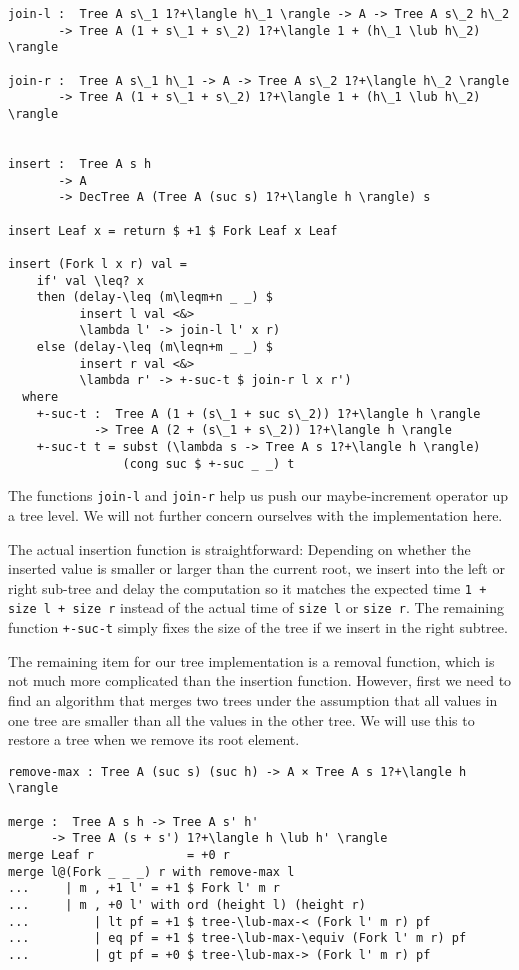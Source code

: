 \begin{lstlisting}[caption={Tree Insertion},label={lst:tree:insert},emph={Tree,Fork,Leaf,insert,join,return,if,then,else}]
join-l :  Tree A s\_1 1?+\langle h\_1 \rangle -> A -> Tree A s\_2 h\_2
       -> Tree A (1 + s\_1 + s\_2) 1?+\langle 1 + (h\_1 \lub h\_2) \rangle

join-r :  Tree A s\_1 h\_1 -> A -> Tree A s\_2 1?+\langle h\_2 \rangle
       -> Tree A (1 + s\_1 + s\_2) 1?+\langle 1 + (h\_1 \lub h\_2) \rangle


insert :  Tree A s h
       -> A
       -> DecTree A (Tree A (suc s) 1?+\langle h \rangle) s

insert Leaf x = return $ +1 $ Fork Leaf x Leaf

insert (Fork l x r) val =
    if' val \leq? x
    then (delay-\leq (m\leqm+n _ _) $
          insert l val <&>
          \lambda l' -> join-l l' x r)
    else (delay-\leq (m\leqn+m _ _) $
          insert r val <&>
          \lambda r' -> +-suc-t $ join-r l x r')
  where
    +-suc-t :  Tree A (1 + (s\_1 + suc s\_2)) 1?+\langle h \rangle
            -> Tree A (2 + (s\_1 + s\_2)) 1?+\langle h \rangle
    +-suc-t t = subst (\lambda s -> Tree A s 1?+\langle h \rangle)
                (cong suc $ +-suc _ _) t
\end{lstlisting}

The functions \texttt{join-l} and \texttt{join-r} help us push our maybe-increment operator up a tree level. We will not further concern ourselves with the implementation here.

The actual insertion function is straightforward: Depending on whether the inserted value is smaller or larger than the current root, we insert into the left or right sub-tree and delay the computation so it matches the expected time \texttt{1 + size l + size r} instead of the actual time of \texttt{size l} or \texttt{size r}. The remaining function \texttt{+-suc-t} simply fixes the size of the tree if we insert in the right subtree.

The remaining item for our tree implementation is a removal function, which is not much more complicated than the insertion function. However, first we need to find an algorithm that merges two trees under the assumption that all values in one tree are smaller than all the values in the other tree. We will use this to restore a tree when we remove its root element.

\begin{lstlisting}[caption={Tree Merge},label={lst:tree:merge},emph={Tree,Fork,Leaf,merge,remove,max}]
remove-max : Tree A (suc s) (suc h) -> A × Tree A s 1?+\langle h \rangle

merge :  Tree A s h -> Tree A s' h'
      -> Tree A (s + s') 1?+\langle h \lub h' \rangle
merge Leaf r             = +0 r
merge l@(Fork _ _ _) r with remove-max l
...     | m , +1 l' = +1 $ Fork l' m r
...     | m , +0 l' with ord (height l) (height r)
...         | lt pf = +1 $ tree-\lub-max-< (Fork l' m r) pf
...         | eq pf = +1 $ tree-\lub-max-\equiv (Fork l' m r) pf
...         | gt pf = +0 $ tree-\lub-max-> (Fork l' m r) pf

\end{lstlisting}

